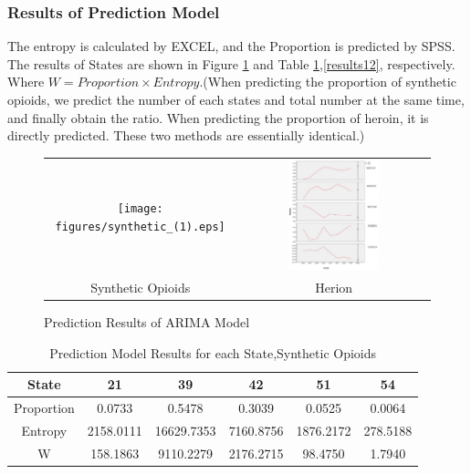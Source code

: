 \documentclass[12pt]{mcmthesis}
\begin{document}
\subsubsection{Results of Prediction Model}
The entropy is calculated by EXCEL, and the Proportion is predicted by SPSS. The results of States are shown in Figure \ref{arimas} and Table \ref{results1},\ref{results12}, respectively. Where $W=Proportion\times Entropy $.(When predicting the proportion of synthetic opioids, we predict the number of each states and total number at the same time, and finally obtain the ratio. When predicting the proportion of heroin, it is directly predicted. These two methods are essentially identical.)\par
\begin{figure}
  \centering
  \begin{tabular}{cc}
    \texttt{[image: figures/synthetic\_(1).eps]}& \includegraphics[width=0.5\textwidth]{figures/herion_(1).eps} \\
    Synthetic Opioids & Herion \\
  \end{tabular}
  \caption{Prediction Results of ARIMA Model }\label{arimas}
\end{figure}
\begin{table}[htb]
\centering
\caption{Prediction Model Results for each State,Synthetic Opioids}\label{results1}
\begin{tabular}{|c|c|c|c|c|c|}
\hline
State      & 21        & 39         & 42        & 51        & 54       \\\hline
Proportion & 0.0733    & 0.5478     & 0.3039    & 0.0525    & 0.0064   \\\hline
Entropy    & 2158.0111 & 16629.7353 & 7160.8756 & 1876.2172 & 278.5188 \\\hline
W          & 158.1863  & 9110.2279  & 2176.2715 & 98.4750   & 1.7940 \\\hline
\end{tabular}
\end{table}
\end{document}

